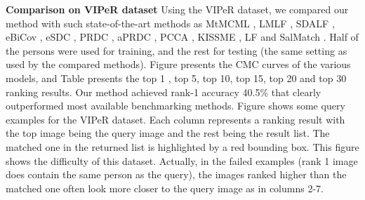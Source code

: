 \documentclass[review]{elsarticle}
\begin{document}
\textbf{Comparison on VIPeR dataset} Using the VIPeR dataset, we compared our method with such state-of-the-art methods as MtMCML \cite{ma2014person}, LMLF \cite{zhao2013learning}, SDALF \cite{farenzena2010person}, eBiCov \cite{ma2012bicov}, eSDC \cite{zhao2013unsupervised}, PRDC \cite{zheng2011person}, aPRDC \cite{liu2012person}, PCCA \cite{mignon2012pcca}, KISSME \cite{kostinger2012large}, LF \cite{pedagadi2013local} and SalMatch \cite{zhao2013person}. Half of the persons were used for training, and the rest for testing (the same setting as used by the compared methods). Figure  presents the CMC curves of the various models, and Table  presents the top 1 , top 5, top 10, top 15, top 20 and top 30 ranking results. Our method achieved rank-1 accuracy 40.5\%  that clearly outperformed most available benchmarking methods. Figure  shows some query examples for the VIPeR dataset. Each column represents a ranking result with the top image being the query image and the rest being the result list. The matched one in the returned list is highlighted by a red bounding box. This figure shows the difficulty of this dataset. Actually, in the failed examples (rank 1 image does contain the same person as the query), the images ranked higher than the matched one often look more closer to the query image as in columns 2-7.
\end{document}

